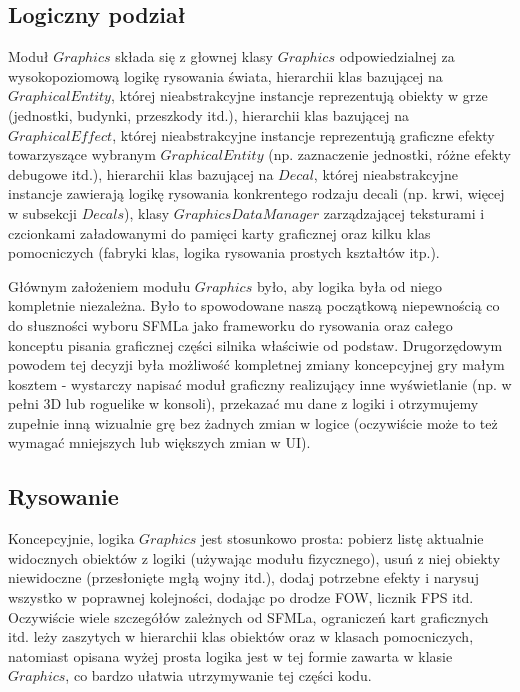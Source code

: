 \documentclass[licencjacka]{pracamgr}
\begin{document}
    \subsection{Logiczny podział}
      Moduł $Graphics$ składa się z głownej klasy $Graphics$ odpowiedzialnej za wysokopoziomową logikę rysowania świata,
      hierarchii klas bazującej na $GraphicalEntity$, której nieabstrakcyjne instancje reprezentują obiekty w grze 
      (jednostki, budynki, przeszkody itd.), hierarchii klas bazującej na $GraphicalEffect$, której nieabstrakcyjne
      instancje reprezentują graficzne efekty towarzyszące wybranym $GraphicalEntity$ (np. zaznaczenie jednostki, 
      różne efekty debugowe itd.), hierarchii klas bazującej na $Decal$, której nieabstrakcyjne instancje zawierają
      logikę rysowania konkrentego rodzaju decali (np. krwi, więcej w subsekcji $Decals$), klasy $GraphicsDataManager$ 
      zarządzającej teksturami i czcionkami załadowanymi do pamięci karty graficznej oraz kilku klas pomocniczych 
      (fabryki klas, logika rysowania prostych kształtów itp.).
      
      Głównym założeniem modułu $Graphics$ było, aby logika była od niego kompletnie niezależna. Było to spowodowane
      naszą początkową niepewnością co do słuszności wyboru SFMLa jako frameworku do rysowania oraz całego konceptu
      pisania graficznej części silnika właściwie od podstaw. Drugorzędowym powodem tej decyzji była możliwość
      kompletnej zmiany koncepcyjnej gry małym kosztem - wystarczy napisać moduł graficzny realizujący inne wyświetlanie
      (np. w pełni 3D lub roguelike w konsoli), przekazać mu dane z logiki i otrzymujemy zupełnie inną wizualnie grę bez
      żadnych zmian w logice (oczywiście może to też wymagać mniejszych lub większych zmian w UI).
    
    \subsection{Rysowanie}
      Koncepcyjnie, logika $Graphics$ jest stosunkowo prosta: pobierz listę aktualnie widocznych obiektów z logiki 
      (używając modułu fizycznego), usuń z niej obiekty niewidoczne (przesłonięte mgłą wojny itd.), dodaj potrzebne 
      efekty i narysuj wszystko w poprawnej kolejności, dodając po drodze FOW, licznik FPS itd. Oczywiście wiele
      szczegółów zależnych od SFMLa, ograniczeń kart graficznych itd. leży zaszytych w hierarchii klas obiektów oraz w
      klasach pomocniczych, natomiast opisana wyżej prosta logika jest w tej formie zawarta w klasie $Graphics$, co
      bardzo ułatwia utrzymywanie tej części kodu.
      
\end{document}
